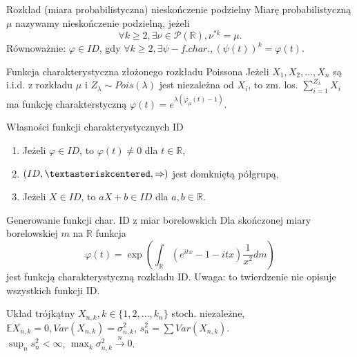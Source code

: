 \documentclass[avery5371, grid, frame]{flashcards}
\begin{document}

\begin{flashcard}[Definicja]{Rozkład (miara probabilistyczna) nieskończenie podzielny}
    Miarę probabilistyczną $\mu$ nazywamy nieskończenie podzielną, jeżeli 
    $$ \forall k \geq 2, \exists \nu \in \mathcal{P}(\mathbb{R}),  \nu^{*k} = \mu.$$
    Równoważnie:
    $\varphi \in ID$, gdy  $\forall k \geq 2, \exists \psi - f.char., (\psi(t))^k = \varphi(t).$
\end{flashcard}

\begin{flashcard}[Twierdzenie]{Funkcja charakterystyczna złożonego rozkładu Poissona}
    Jeżeli $X_1, X_2, \dots, X_n$ są i.i.d. z rozkładu $\mu$ i $Z_\lambda \sim Pois(\lambda)$ jest niezależna od $X_i$, to zm. los. $\sum_{i=1}^{Z_\lambda} X_i$ ma funkcję charakterstyczną $\varphi(t) = e^{\lambda (\varphi_\mu(t) - 1)}$.
\end{flashcard}

\begin{flashcard}[Twierdzenie]{Własności funkcji charakterystycznych ID}
    \begin{enumerate}
        \item Jeżeli $\varphi \in ID$, to $\varphi(t) \neq 0$ dla $t \in \mathbb{R}$,
        \item $(ID, \textasteriskcentered, \Rightarrow)$ jest domkniętą półgrupą,
        \item Jeżeli $X \in ID$, to $aX + b \in ID$ dla $a, b \in \mathbb{R}$.
    \end{enumerate}
\end{flashcard}

\begin{flashcard}[Twierdzenie]{Generowanie funkcji char. ID z miar borelowskich}
    Dla skończonej miary borelowskiej $m$ na $\mathbb{R}$ funkcja 
    $$ \varphi(t) = \exp \left (\int_\mathbb{R} (e^{itx} - 1 - itx) \frac{1}{x^2} dm \right) $$ jest funkcją charakterystyczną rozkładu ID. Uwaga: to twierdzenie nie opisuje wszystkich funkcji ID.
\end{flashcard}

\begin{flashcard}[Definicja]{Układ trójkątny}
    $X_{n, k}, k \in \{1, 2, \dots, k_n \}$ stoch. niezależne, $\mathbb{E}X_{n, k} = 0, Var(X_{n, k}) = \sigma^2_{n, k}$, $s_n^2 = \sum Var(X_{n, k})$. \\
    $\sup_n s_n^2 < \infty$, $\max_k \sigma_{n,k}^2 \xrightarrow{n} 0$.
\end{flashcard}
\end{document}
